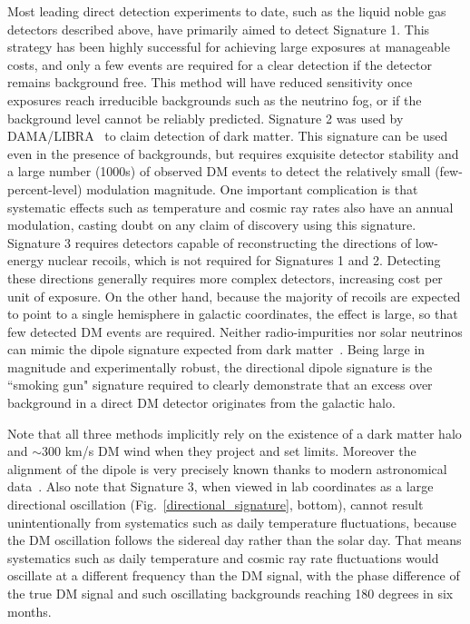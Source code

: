 Most leading direct detection experiments to date, such as the liquid noble gas detectors described above, have primarily aimed to detect Signature 1. This strategy has been highly successful for achieving large exposures at manageable costs, and only a few events are required for a clear detection if the detector remains background free. This method will have reduced sensitivity once exposures reach irreducible backgrounds such as the neutrino fog, or if the background level cannot be reliably predicted. Signature 2 was used by DAMA/LIBRA~\cite{Bernabei:2019ajy} to claim detection of dark matter. This signature can be used even in the presence of backgrounds, but requires exquisite detector stability and a large number (1000s) of observed DM events to detect the relatively small (few-percent-level) modulation magnitude. One important complication is that systematic effects such as temperature and cosmic ray rates also have an annual modulation, casting doubt on any claim of discovery using this signature. Signature 3 requires detectors capable of reconstructing the directions of low-energy nuclear recoils, which is not required for Signatures 1 and 2. Detecting these directions generally requires more complex detectors, increasing cost per unit of exposure. On the other hand, because the majority of recoils are expected to point to a single hemisphere in galactic coordinates, the effect is large, so that few detected DM events are required. Neither radio-impurities nor solar neutrinos can mimic the dipole signature expected from dark matter~\cite{OHare:2015utx}. Being large in magnitude and experimentally robust, the directional dipole signature is the ``smoking gun" signature required to clearly demonstrate that an excess over background in a direct DM detector originates from the galactic halo.

Note that all three methods implicitly rely on the existence of a dark matter halo and $\sim 300$ km/s DM wind when they project and set limits. Moreover the alignment of the dipole is very precisely known thanks to modern astronomical data~\cite{GaiaDR2_disk}. Also note that Signature 3, when viewed in lab coordinates as a large directional oscillation (Fig.~\ref{directional_signature}, bottom), cannot result unintentionally from systematics such as daily temperature fluctuations, because the DM oscillation follows the sidereal day rather than the solar day. That means systematics such as daily temperature and cosmic ray rate fluctuations would oscillate at a different frequency than the DM signal, with the phase difference of the true DM signal and such oscillating backgrounds reaching 180 degrees in six months.





